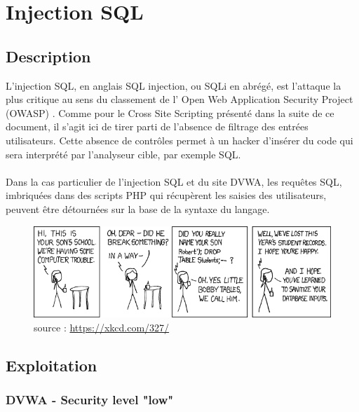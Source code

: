 
\newpage
\section{Injection SQL }


\subsection{Description}




L'injection SQL, en anglais SQL  injection, ou SQLi en abrégé, est l'attaque la plus critique au sens du classement de l' Open Web Application Security Project (OWASP) . Comme pour le Cross Site Scripting présenté dans la suite de ce document, il s'agit ici de tirer parti de l'absence de filtrage des entrées utilisateurs. Cette absence de contrôles permet à un hacker d'insérer du code qui sera interprété par l'analyseur cible, par exemple SQL.




\paragraph{}
Dans la cas particulier de l'injection SQL et du site DVWA, les requêtes SQL, imbriquées dans des scripts PHP qui récupèrent les saisies des utilisateurs, peuvent être détournées sur la base de la syntaxe du langage. 

\begin{figure}[!h]
	\begin{center}
		\includegraphics[scale=0.72]{images/bd.png}
		\caption{source : \url{https://xkcd.com/327/}}
	\end{center}
\end{figure}


\subsection{Exploitation}

\subsubsection{DVWA - Security level "low"}

